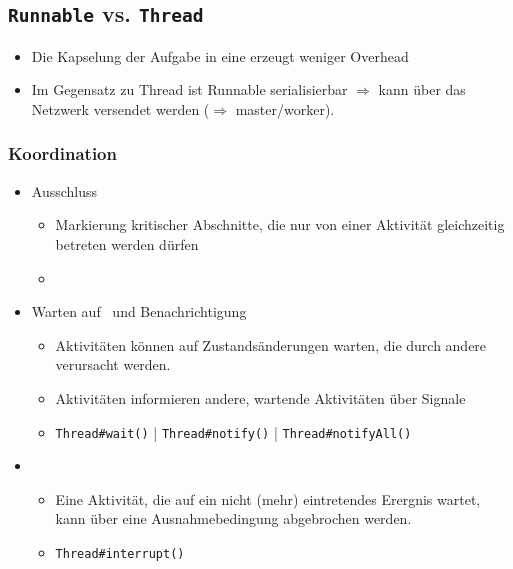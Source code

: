 \subsection{\texttt{Runnable} vs. \texttt{Thread}}
\begin{itemize}
    \item Die Kapselung der Aufgabe in eine  erzeugt weniger Overhead
    \item Im Gegensatz zu Thread ist Runnable serialisierbar $\Rightarrow$ kann über das Netzwerk versendet werden ($\Rightarrow$ master/worker).
\end{itemize}

\subsubsection{Koordination}
\begin{itemize}
    \item {} Ausschluss
    \begin{itemize}
        \item Markierung kritischer Abschnitte, die nur von einer Aktivität gleichzeitig betreten werden dürfen
        \item {}
    \end{itemize}
    \item Warten auf \glqq{}\grqq\ und Benachrichtigung
    \begin{itemize}
        \item Aktivitäten können auf Zustandsänderungen warten, die durch andere verursacht werden.
        \item Aktivitäten informieren andere, wartende Aktivitäten über Signale
        \item \texttt{Thread\#wait()} | \texttt{Thread\#notify()} | \texttt{Thread\#notifyAll()}
    \end{itemize}
    \item {}
    \begin{itemize}
        \item Eine Aktivität, die auf ein nicht (mehr) eintretendes Erergnis wartet, kann über eine Ausnahmebedingung abgebrochen werden.
        \item \texttt{Thread\#interrupt()}
    \end{itemize}
\end{itemize}

